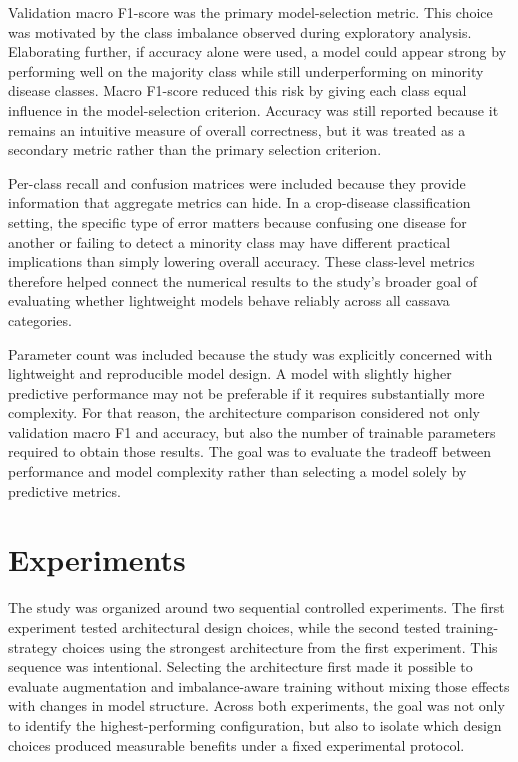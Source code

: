 \documentclass[11pt]{article}
\begin{document}
Validation macro F1-score was the primary model-selection metric. This choice was motivated by the class imbalance observed during exploratory analysis. Elaborating further, if accuracy alone were used, a model could appear strong by performing well on the majority class while still underperforming on minority disease classes. Macro F1-score reduced this risk by giving each class equal influence in the model-selection criterion. Accuracy was still reported because it remains an intuitive measure of overall correctness, but it was treated as a secondary metric rather than the primary selection criterion.

Per-class recall and confusion matrices were included because they provide information that aggregate metrics can hide. In a crop-disease classification setting, the specific type of error matters because confusing one disease for another or failing to detect a minority class may have different practical implications than simply lowering overall accuracy. These class-level metrics therefore helped connect the numerical results to the study's broader goal of evaluating whether lightweight models behave reliably across all cassava categories.

Parameter count was included because the study was explicitly concerned with lightweight and reproducible model design. A model with slightly higher predictive performance may not be preferable if it requires substantially more complexity. For that reason, the architecture comparison considered not only validation macro F1 and accuracy, but also the number of trainable parameters required to obtain those results. The goal was to evaluate the tradeoff between performance and model complexity rather than selecting a model solely by predictive metrics.


\section{Experiments}

The study was organized around two sequential controlled experiments. The first experiment tested architectural design choices, while the second tested training-strategy choices using the strongest architecture from the first experiment. This sequence was intentional. Selecting the architecture first made it possible to evaluate augmentation and imbalance-aware training without mixing those effects with changes in model structure. Across both experiments, the goal was not only to identify the highest-performing configuration, but also to isolate which design choices produced measurable benefits under a fixed experimental protocol.
\end{document}
